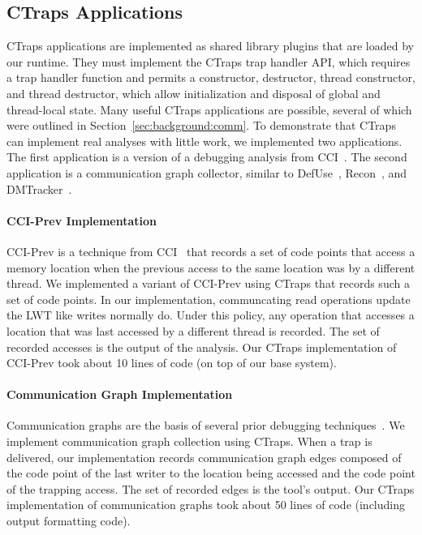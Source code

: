 \documentclass[preprint,9pt]{sigplanconf}
\newcommand{\ctraps}{CTraps\xspace}
\begin{document}


\subsection{\ctraps Applications}
\label{sec:apps}
\ctraps applications are implemented as shared library plugins that are loaded
by our runtime.  They must implement the \ctraps trap handler API, which
requires a trap handler function and permits a constructor, destructor, thread
constructor, and thread destructor, which allow initialization and disposal of
global and thread-local state.  Many useful \ctraps applications are possible,
several of which were outlined in Section~\ref{sec:background:comm}.    To
demonstrate that \ctraps can implement real analyses with little work, we
implemented two applications. The first application is a version of a debugging
analysis from CCI~\cite{cci}.  The second application is a communication graph
collector, similar to DefUse~\cite{defuse}, Recon~\cite{recon}, and
DMTracker~\cite{dmtracker}.

\paragraph{CCI-Prev Implementation}
CCI-Prev is a technique from CCI~\cite{cci} that records a set of code points
that access a memory location when the previous access to the same location was
by a different thread.  We implemented a variant of CCI-Prev using \ctraps that
records such a set of code points.  In our implementation, communcating read
operations update the LWT like writes normally do.  Under this policy, any
operation that accesses a location that was last accessed by a different thread
is recorded.  The set of recorded accesses is the output of the analysis.  Our
\ctraps implementation of CCI-Prev took about 10 lines of code (on top of our
base system). 

\paragraph{Communication Graph Implementation}
Communication graphs are the basis of several prior debugging
techniques~\cite{recon, bugaboo, defuse}.  We implement communication graph
collection using \ctraps.  When a trap is delivered, our implementation records
communication graph edges composed of the code point of the last writer to the
location being accessed and the code point of the trapping access.  The set of
recorded edges is the tool's output.  Our \ctraps implementation of
communication graphs took about 50 lines of code (including output formatting
code). 
\end{document}
